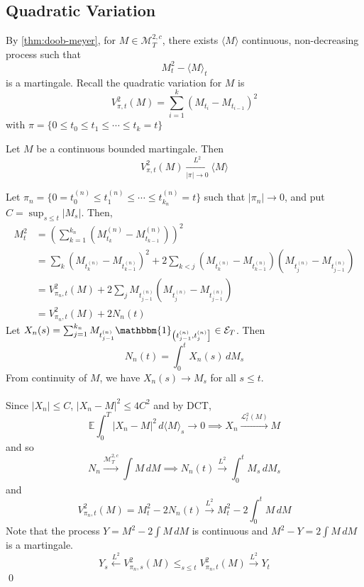\documentclass[12pt,a4paper]{article}
\newcommand{\E}{\mathbb{E}}
\renewenvironment{proof}
    {\begin{trivlist}\item[\hskip\labelsep\color{blue}\bfseries Proof:]}
    {\qed\end{trivlist}}
\begin{document}
\subsection{Quadratic Variation}
By \autoref{thm:doob-meyer}, for $M\in\mathcal{M}^{2,c}_T$, there exists $\langle M\rangle$ continuous, non-decreasing process such that
$$
M^2_t-\langle M\rangle_t
$$
is a martingale. Recall the quadratic variation for $M$ is
$$
V^{2}_{\pi,t}(M) = \sum_{i=1}^k (M_{t_i}-M_{t_{i-1}})^2
$$
with $\pi = \{0\le t_0\le t_1\le\cdots\le t_k=t\}$
\begin{theorem}{}{}
    Let $M$ be a continuous bounded martingale. Then 
    $$
    V_{\pi,t}^2(M)\xrightarrow[|\pi|\to 0]{L^2} \langle M\rangle
    $$
\end{theorem}
\begin{proof}
    Let $\pi_n = \{0=t_0^{(n)}\le t_1^{(n)}\le \cdots\le t_{k_n}^{(n)}=t\}$ such that $|\pi_n|\to 0$, and put $C =\sup_{s\le t}|M_s|$. Then,
    \begin{align*}
        M_t^2 &= \left(\sum_{k=1}^{k_n}\left(M_{t_k}^{(n)}-M_{t_{k-1}}^{(n)}\right)\right)^2\\
        &= \sum_k\left(M_{t_k^{(n)}}-M_{t_{k-1}^{(n)}}\right)^2 + 2\sum_{k<j}\left(M_{t_k^{(n)}}-M_{t_{k-1}^{(n)}}\right)\left(M_{t_j^{(n)}}-M_{t_{j-1}^{(n)}}\right)\\
        &= V_{\pi_n,t}^2(M) + 2\sum_{j}M_{t_{j-1}^{(n)}}\left(M_{t_j^{(n)}}-M_{t_{j-1}^{(n)}}\right)\\
        &= V_{\pi_n,t}^2(M)+2N_n(t)
    \end{align*}
    Let $X_n(s) = \sum_{j=1}^{k_n}M_{t_{j-1}^{(n)}}\mathbbm{1}_{\left(t_{j-1}^{(n)},t_{j}^{(n)}\right]}\in \mathcal{E}_T$. Then
    $$
    N_n(t) = \int_0^t X_n(s)\, dM_s
    $$
    From continuity of $M$, we have $X_n(s)\to M_s$ for all $s\le t$.\\
    \\
    Since $|X_n|\le C$, $|X_n-M|^2\le 4C^2$ and by DCT,
    $$
    \E\int_0^T |X_n-M|^2\, d\langle M\rangle_s \to 0\implies X_n\xrightarrow{\mathcal{L}_t^2(M)}M
    $$
    and so 
    $$
    N_n\xrightarrow{\mathcal{M}_T^{2,c}}\int M\,dM\implies N_n(t)\xrightarrow{L^2}\int_0^t M_s\, dM_s
    $$
    and
    $$
    V_{\pi_n,t}^2(M) = M_t^2-2N_n(t)\xrightarrow{L^2} M_t^2-2\int_0^t M\, dM
    $$
    Note that the process $Y=M^2-2\int M\,dM$ is continuous and $M^2-Y =2\int M\, dM$ is a martingale.
    $$
    Y_s\xleftarrow{L^2}V_{\pi_n,s}^2(M)\le_{s\le t} V_{\pi_n,t}^2 (M)\xrightarrow{L^2}Y_t
    $$
\end{proof}
\end{document}
